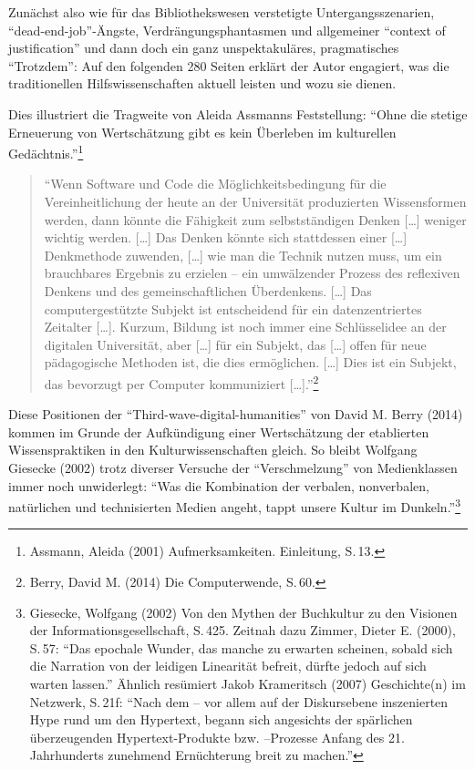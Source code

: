 \documentclass[a4paper,
fontsize=11pt,
oneside,
numbers=noperiodatend,
parskip=half-,
bibliography=totoc,
final
]{scrartcl}
\begin{document}
Zunächst also wie für das Bibliothekswesen verstetigte
Untergangsszenarien, \enquote{dead-end-job}-Ängste,
Verdrängungsphantasmen und allgemeiner \enquote{context of
justification} und dann doch ein ganz unspektakuläres, pragmatisches
\enquote{Trotzdem}: Auf den folgenden 280 Seiten erklärt der Autor
engagiert, was die traditionellen Hilfswissenschaften aktuell leisten
und wozu sie dienen.

Dies illustriert die Tragweite von Aleida Assmanns Feststellung:
\enquote{Ohne die stetige Erneuerung von Wertschätzung gibt es kein
Überleben im kulturellen Gedächtnis.}\footnote{Assmann, Aleida (2001)
  Aufmerksamkeiten. Einleitung, S.\,13.}

\begin{quote}
\enquote{Wenn Software und Code die Möglichkeitsbedingung für die
Vereinheitlichung der heute an der Universität produzierten
Wissensformen werden, dann könnte die Fähigkeit zum selbstständigen
Denken {[}\ldots{}{]} weniger wichtig werden. {[}\ldots{}{]} Das Denken
könnte sich stattdessen einer {[}\ldots{}{]} Denkmethode zuwenden,
{[}\ldots{}{]} wie man die Technik nutzen muss, um ein brauchbares
Ergebnis zu erzielen -- ein umwälzender Prozess des reflexiven Denkens
und des gemeinschaftlichen Überdenkens. {[}\ldots{}{]} Das
computergestützte Subjekt ist entscheidend für ein datenzentriertes
Zeitalter {[}\ldots{}{]}. Kurzum, Bildung ist noch immer eine
Schlüsselidee an der digitalen Universität, aber {[}\ldots{}{]} für ein
Subjekt, das {[}\ldots{}{]} offen für neue pädagogische Methoden ist,
die dies ermöglichen. {[}\ldots{}{]} Dies ist ein Subjekt, das bevorzugt
per Computer kommuniziert {[}\ldots{}{]}.}\footnote{Berry, David M.
  (2014) Die Computerwende, S.\,60.}
\end{quote}

Diese Positionen der \enquote{Third-wave-digital-humanities} von David
M. Berry (2014) kommen im Grunde der Aufkündigung einer Wertschätzung
der etablierten Wissenspraktiken in den Kulturwissenschaften gleich. So
bleibt Wolfgang Giesecke (2002) trotz diverser Versuche der
\enquote{Verschmelzung} von Medienklassen immer noch unwiderlegt:
\enquote{Was die Kombination der verbalen, nonverbalen, natürlichen und
technisierten Medien angeht, tappt unsere Kultur im Dunkeln.}\footnote{Giesecke,
  Wolfgang (2002) Von den Mythen der Buchkultur zu den Visionen der
  Informationsgesellschaft, S.\,425. Zeitnah dazu Zimmer, Dieter E.
  (2000), S.\,57: \enquote{Das epochale Wunder, das manche zu erwarten
  scheinen, sobald sich die Narration von der leidigen Linearität
  befreit, dürfte jedoch auf sich warten lassen.} Ähnlich resümiert
  Jakob Krameritsch (2007) Geschichte(n) im Netzwerk, S.\,21f:
  \enquote{Nach dem -- vor allem auf der Diskursebene inszenierten Hype
  rund um den Hypertext, begann sich angesichts der spärlichen
  überzeugenden Hypertext-Produkte bzw. --Prozesse Anfang des 21.
  Jahrhunderts zunehmend Ernüchterung breit zu machen.}}
\end{document}
